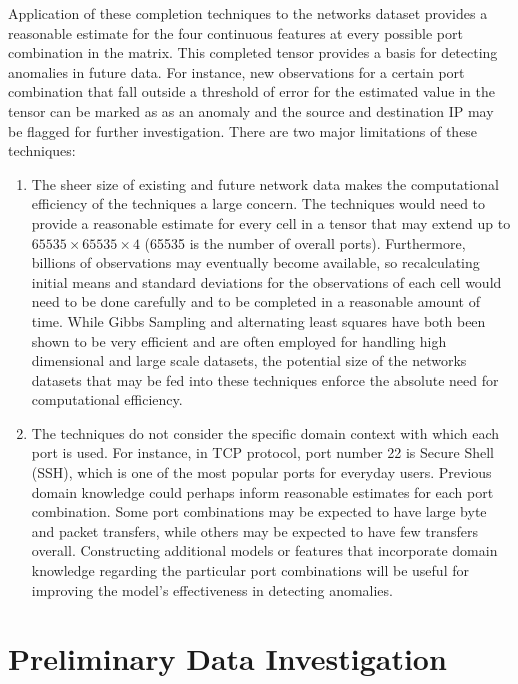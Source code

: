 \documentclass[12pt,twoside]{dukestatscithesis}
\theoremstyle{definition}
\theoremstyle{definition}
\theoremstyle{definition}
\theoremstyle{remark}
\begin{document}
Application of these completion techniques to the networks dataset
provides a reasonable estimate for the four continuous features at every
possible port combination in the matrix. This completed tensor provides
a basis for detecting anomalies in future data. For instance, new
observations for a certain port combination that fall outside a
threshold of error for the estimated value in the tensor can be marked
as as an anomaly and the source and destination IP may be flagged for
further investigation. There are two major limitations of these
techniques:
\begin{enumerate}
\def\labelenumi{\arabic{enumi}.}
\item
  The sheer size of existing and future network data makes the
  computational efficiency of the techniques a large concern. The
  techniques would need to provide a reasonable estimate for every cell
  in a tensor that may extend up to \(65535 \times 65535 \times 4\)
  (65535 is the number of overall ports). Furthermore, billions of
  observations may eventually become available, so recalculating initial
  means and standard deviations for the observations of each cell would
  need to be done carefully and to be completed in a reasonable amount
  of time. While Gibbs Sampling and alternating least squares have both
  been shown to be very efficient and are often employed for handling
  high dimensional and large scale datasets, the potential size of the
  networks datasets that may be fed into these techniques enforce the
  absolute need for computational efficiency.
\item
  The techniques do not consider the specific domain context with which
  each port is used. For instance, in TCP protocol, port number 22 is
  Secure Shell (SSH), which is one of the most popular ports for
  everyday users. Previous domain knowledge could perhaps inform
  reasonable estimates for each port combination. Some port combinations
  may be expected to have large byte and packet transfers, while others
  may be expected to have few transfers overall. Constructing additional
  models or features that incorporate domain knowledge regarding the
  particular port combinations will be useful for improving the model's
  effectiveness in detecting anomalies.
\end{enumerate}
\appendix

\chapter{Preliminary Data
Investigation}\label{preliminary-data-investigation}
\end{document}
